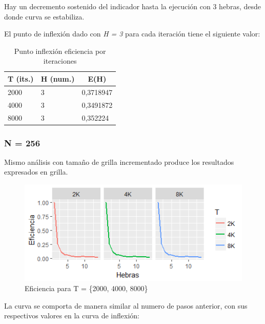 \documentclass[jou]{apa6}
\begin{document}
Hay un decremento sostenido del indicador hasta la ejecución con 3 hebras, desde donde curva se estabiliza.

El punto de inflexión dado con \textit{H = 3} para cada iteración tiene el siguiente valor:

\begin{table}[]
\centering
\caption{Punto inflexión eficiencia por iteraciones}
\label{my-label}
\begin{tabular}{@{}lll@{}}
\toprule
\multicolumn{1}{c}{T (its.)} & \multicolumn{1}{c}{H (num.)} & \multicolumn{1}{c}{E(H)} \\ \midrule
2000                         & 3                            & 0,3718947                \\
4000                         & 3                            & 0,3491872                \\
8000                         & 3                            & 0,352224                 \\ \bottomrule
\end{tabular}
\end{table}

\subsubsection{N = 256}
Mismo análisis con tamaño de grilla incrementado produce los resultados expresados en grilla.

\begin{figure}[h]
	\includegraphics[width=\columnwidth]{efic-256px.png}
	\caption{Eficiencia para T = \{2000, 4000, 8000\}}
	\label{fig:Figure6}
\end{figure}

La curva se comporta de manera similar al numero de pasos anterior, con sus respectivos valores en la curva de inflexión:
\end{document}

